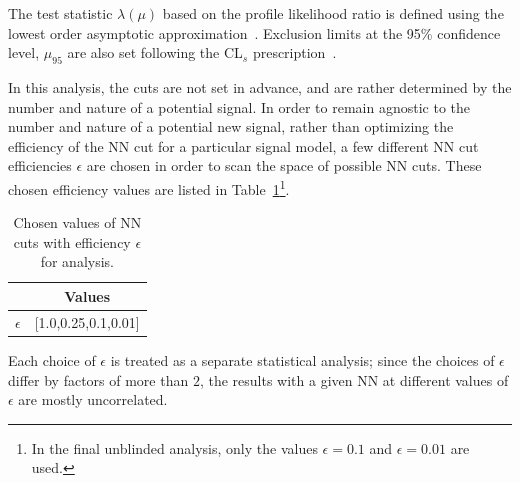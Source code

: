 The test statistic $\lambda(\mu)$ based on the profile likelihood ratio is defined using the lowest order asymptotic approximation~\cite{Cowan:2010js}.
Exclusion limits at the 95\% confidence level, $\mu_{95}$ are also set following the CL$_s$ prescription~\cite{Read:2002hq}.

In this analysis, the cuts are not set in advance, and are rather determined by the number and nature of a potential signal.
In order to remain agnostic to the number and nature of a potential new signal, rather than optimizing the efficiency of the NN cut for a particular signal model, a few different NN cut efficiencies $\epsilon$ are chosen in order to scan the space of possible NN cuts.
These chosen efficiency values are listed in Table~\ref{tab:effs}\footnote{In the final unblinded analysis, only the values $\epsilon=0.1$ and $\epsilon=0.01$ are used.}.
\begin{table}[htb]
  \centering
  \caption{Chosen values of NN cuts with efficiency $\epsilon$ for analysis.}
  \label{tab:effs}
  \begin{tabular}{c c}
    \hline
 & Values   \\ \hline
$\epsilon$ & [1.0,0.25,0.1,0.01] \\
    \hline
  \end{tabular}
\end{table}
Each choice of $\epsilon$ is treated as a separate statistical analysis; since the choices of $\epsilon$ differ by factors of more than $2$, the results with a given NN at different values of $\epsilon$ are mostly uncorrelated.

